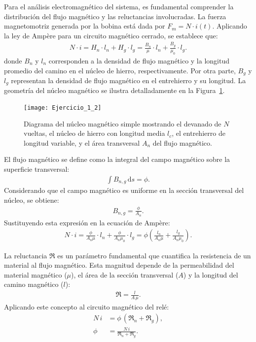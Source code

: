 \documentclass[
  11pt,
  letterpaper,
   addpoints,
   answers
  ]{exam}
\newcommand{\Rel}{\mathfrak{R}} %
\begin{document}
Para el análisis electromagnético del sistema, es fundamental comprender la distribución del flujo magnético y las reluctancias involucradas. La fuerza magnetomotriz generada por la bobina está dada por $F_m = N \cdot i(t)$. Aplicando la ley de Ampère para un circuito magnético cerrado, se establece que:
\begin{align}
  N \cdot i = H_n \cdot l_n + H_g \cdot l_g  = \frac{B_n}{\mu} \cdot l_n + \frac{B_g}{\mu_0} \cdot l_g .
\end{align}
donde $B_n$ y $l_n$ corresponden a la densidad de flujo magnético y la longitud promedio del camino en el núcleo de hierro, respectivamente. Por otra parte, $B_g$ y $l_g$ representan la densidad de flujo magnético en el entrehierro y su longitud. La geometría del núcleo magnético se ilustra detalladamente en la Figura~\ref{fig:core}.

\begin{figure}[h!]
  \centering
  \texttt{[image: Ejercicio\_1\_2]}
  \caption{Diagrama del núcleo magnético simple mostrando el devanado de $N$ vueltas, el núcleo de hierro con longitud media $l_c$, el entrehierro de longitud variable, y el área transversal $A_n$ del flujo magnético.}
  \label{fig:core}
\end{figure}

El flujo magnético se define como la integral del campo magnético sobre la superficie transversal:
\begin{align}
  \int B_{n,g}\, \mathrm{d}s = \phi.
\end{align}
Considerando que el campo magnético es uniforme en la sección transversal del núcleo, se obtiene:
\begin{align}
  B_{n,g} = \frac{\phi}{A_n}.
\end{align}
Sustituyendo esta expresión en la ecuación de Ampère:
\begin{align}
  N \cdot i = \frac{\phi}{A_n \mu} \cdot l_n + \frac{\phi}{A_n \mu_0} \cdot l_g = \phi\!\left(\frac{l_n}{A_n \mu} + \frac{l_g}{A_n \mu_0}\right).
\end{align}

La reluctancia $\Rel$ es un parámetro fundamental que cuantifica la resistencia de un material al flujo magnético. Esta magnitud depende de la permeabilidad del material magnético ($\mu$), el área de la sección transversal ($A$) y la longitud del camino magnético ($l$):
\begin{align}
  \Rel = \frac{l}{A\,\mu}.
\end{align}
Aplicando este concepto al circuito magnético del relé:
\begin{align}
  N\,i &= \phi\,(\Rel_n + \Rel_g), \\
  \phi &= \frac{N\,i}{\Rel_n + \Rel_g}.
\end{align}
\end{document}
